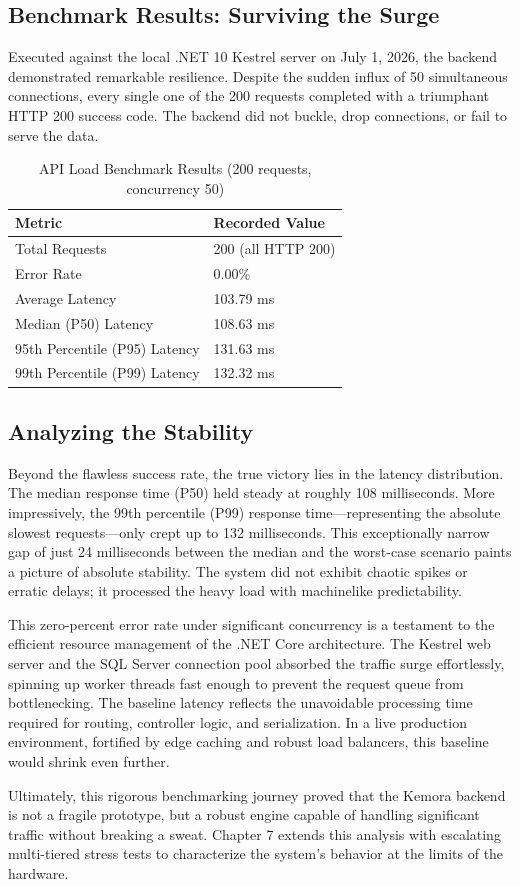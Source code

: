 \subsection{Benchmark Results: Surviving the Surge}
Executed against the local .NET 10 Kestrel server on July 1, 2026, the backend demonstrated remarkable resilience. Despite the sudden influx of 50 simultaneous connections, every single one of the 200 requests completed with a triumphant HTTP 200 success code. The backend did not buckle, drop connections, or fail to serve the data.

\begin{table}[H]
\centering
\begin{tabular}{|l|l|}
\hline
\textbf{Metric} & \textbf{Recorded Value} \\ \hline
Total Requests & 200 (all HTTP 200) \\ \hline
Error Rate & 0.00\% \\ \hline
Average Latency & 103.79 ms \\ \hline
Median (P50) Latency & 108.63 ms \\ \hline
95th Percentile (P95) Latency & 131.63 ms \\ \hline
99th Percentile (P99) Latency & 132.32 ms \\ \hline
\end{tabular}
\caption{API Load Benchmark Results (200 requests, concurrency 50)}
\label{tab:benchmark}
\end{table}

\subsection{Analyzing the Stability}
Beyond the flawless success rate, the true victory lies in the latency distribution. The median response time (P50) held steady at roughly 108 milliseconds. More impressively, the 99th percentile (P99) response time---representing the absolute slowest requests---only crept up to 132 milliseconds. This exceptionally narrow gap of just 24 milliseconds between the median and the worst-case scenario paints a picture of absolute stability. The system did not exhibit chaotic spikes or erratic delays; it processed the heavy load with machinelike predictability.

This zero-percent error rate under significant concurrency is a testament to the efficient resource management of the .NET Core architecture. The Kestrel web server and the SQL Server connection pool absorbed the traffic surge effortlessly, spinning up worker threads fast enough to prevent the request queue from bottlenecking. The baseline latency reflects the unavoidable processing time required for routing, controller logic, and serialization. In a live production environment, fortified by edge caching and robust load balancers, this baseline would shrink even further.

Ultimately, this rigorous benchmarking journey proved that the Kemora backend is not a fragile prototype, but a robust engine capable of handling significant traffic without breaking a sweat. Chapter 7 extends this analysis with escalating multi-tiered stress tests to characterize the system's behavior at the limits of the hardware.
